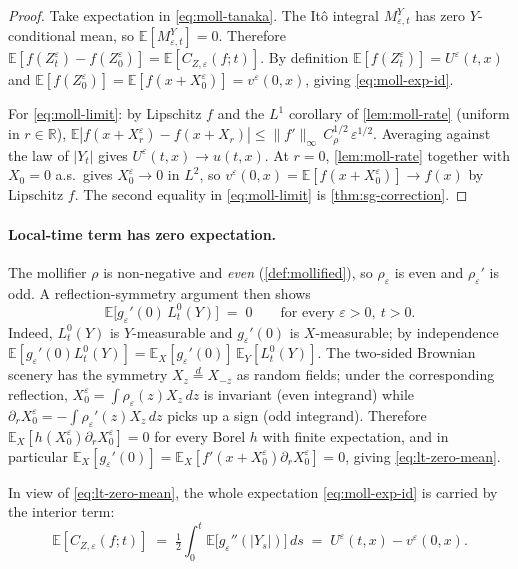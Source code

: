 \documentclass[11pt,reqno]{amsart}
\theoremstyle{plain}
\theoremstyle{definition}
\theoremstyle{remark}
\newcommand{\R}{\mathbb{R}}
\newcommand{\E}{\mathbb{E}}
\newcommand{\IBM}{Z}
\begin{document}
\begin{proof}
Take expectation in \eqref{eq:moll-tanaka}. The It\^o integral
$M_{\varepsilon,t}^{Y}$ has zero $Y$-conditional mean, so
$\E[M_{\varepsilon,t}^{Y}]=0$. Therefore
$\E[f(Z_t^\varepsilon)-f(Z_0^\varepsilon)]=\E[C_{\IBM,\varepsilon}(f;t)]$.
By definition $\E[f(Z_t^\varepsilon)]=U^\varepsilon(t,x)$ and
$\E[f(Z_0^\varepsilon)]=\E[f(x+X^\varepsilon_0)]=v^\varepsilon(0,x)$,
giving \eqref{eq:moll-exp-id}.

For \eqref{eq:moll-limit}: by Lipschitz $f$ and the $L^{1}$ corollary
of \cref{lem:moll-rate} (uniform in $r\in\R$),
$\E|f(x+X^\varepsilon_r)-f(x+X_r)|\le\|f'\|_\infty\,
C_\rho^{1/2}\,\varepsilon^{1/2}$. Averaging against the law of
$|Y_t|$ gives $U^\varepsilon(t,x)\to u(t,x)$. At $r=0$,
\cref{lem:moll-rate} together with $X_0=0$ a.s.\ gives
$X^\varepsilon_0\to 0$ in $L^{2}$, so $v^\varepsilon(0,x)
=\E[f(x+X^\varepsilon_0)]\to f(x)$ by Lipschitz $f$. The second
equality in \eqref{eq:moll-limit} is \cref{thm:sg-correction}.
\end{proof}

\paragraph{Local-time term has zero expectation.}
The mollifier $\rho$ is non-negative and \emph{even}
(\cref{def:mollified}), so $\rho_\varepsilon$ is even and
$\rho_\varepsilon'$ is odd. A reflection-symmetry argument then
shows
\begin{equation}\label{eq:lt-zero-mean}
  \E\bigl[g_\varepsilon'(0)\,L_t^{0}(Y)\bigr]\;=\;0
  \qquad\text{for every }\varepsilon>0,\ t>0.
\end{equation}
Indeed, $L_t^{0}(Y)$ is $Y$-measurable and $g_\varepsilon'(0)$ is
$X$-measurable; by independence $\E[g_\varepsilon'(0)L_t^{0}(Y)]
=\E_X[g_\varepsilon'(0)]\,\E_Y[L_t^{0}(Y)]$. The two-sided Brownian
scenery has the symmetry $X_z\stackrel{d}{=}X_{-z}$ as random fields;
under the corresponding reflection, $X^\varepsilon_0
=\int\rho_\varepsilon(z)X_z\,dz$ is invariant (even integrand) while
$\partial_rX^\varepsilon_0=-\int\rho_\varepsilon'(z)X_z\,dz$ picks up a
sign (odd integrand). Therefore $\E_X[h(X^\varepsilon_0)
\partial_rX^\varepsilon_0]=0$ for every Borel $h$ with finite
expectation, and in particular $\E_X[g_\varepsilon'(0)]
=\E_X[f'(x+X^\varepsilon_0)\partial_rX^\varepsilon_0]=0$, giving
\eqref{eq:lt-zero-mean}.

In view of \eqref{eq:lt-zero-mean}, the whole expectation
\eqref{eq:moll-exp-id} is carried by the interior term:
\[
  \E[C_{\IBM,\varepsilon}(f;t)]
  \;=\;\tfrac12\int_0^t\E\bigl[g_\varepsilon''(|Y_s|)\bigr]\,ds
  \;=\;U^\varepsilon(t,x)-v^\varepsilon(0,x).
\]
\end{document}
